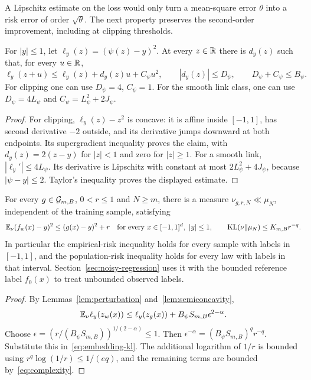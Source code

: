 A Lipschitz estimate on the loss would only turn a mean-square error $\theta$ into a risk error of order $\sqrt\theta$. The next property preserves the second-order improvement, including at clipping thresholds.

\begin{lemma}\label{lem:semiconcavity}
For $|y|\le1$, let $\ell_y(z)=(\psi(z)-y)^2$. At every $z\in\mathbb R$ there is $d_y(z)$ such that, for every $u\in\mathbb R$,
\begin{equation}
 \ell_y(z+u)\le\ell_y(z)+d_y(z)u+C_\psi u^2,
 \qquad |d_y(z)|\le D_\psi,\qquad D_\psi+C_\psi\le B_\psi.
 \label{eq:semiconcavity}
\end{equation}
For clipping one can use $D_\psi=4$, $C_\psi=1$. For the smooth link class, one can use $D_\psi=4L_\psi$ and $C_\psi=L_\psi^2+2J_\psi$.
\end{lemma}
\begin{proof}
For clipping, $\ell_y(z)-z^2$ is concave: it is affine inside $[-1,1]$, has second derivative $-2$ outside, and its derivative jumps downward at both endpoints. Its supergradient inequality proves the claim, with $d_y(z)=2(z-y)$ for $|z|<1$ and zero for $|z|\ge1$.
For a smooth link, $|\ell_y'|\le4L_\psi$. Its derivative is Lipschitz with constant at most $2L_\psi^2+4J_\psi$, because $|\psi-y|\le2$. Taylor's inequality proves the displayed estimate.
\end{proof}

\begin{lemma}\label{lem:comparison}
For every $g\in\mathcal G_{m,B}$, $0<r\le1$ and $N\ge m$, there is a measure $\nu_{g,r,N}\ll\mu_N$, independent of the training sample, satisfying
\begin{equation}
 \mathbb E_\nu(f_w(x)-y)^2\le(g(x)-y)^2+r
 \quad\text{for every }x\in[-1,1]^d,\ |y|\le1,
 \qquad \operatorname{KL}(\nu\|\mu_N)\le K_{m,B}r^{-q}.
 \label{eq:comparison}
\end{equation}
In particular the empirical-risk inequality holds for every sample with labels in $[-1,1]$, and the population-risk inequality holds for every law with labels in that interval. Section~\ref{sec:noisy-regression} uses it with the bounded reference label $f_0(x)$ to treat unbounded observed labels.
\end{lemma}
\begin{proof}
By Lemmas~\ref{lem:perturbation} and~\ref{lem:semiconcavity},
\[
 \mathbb E_\nu\ell_y(z_w(x))\le\ell_y(z_g(x))+B_\psi S_{m,B}\epsilon^{2-\alpha}.
\]
Choose $\epsilon=(r/(B_\psi S_{m,B}))^{1/(2-\alpha)}\le1$. Then $\epsilon^{-\alpha}=(B_\psi S_{m,B})^q r^{-q}$. Substitute this in~\eqref{eq:embedding-kl}. The additional logarithm of $1/r$ is bounded using $r^q\log(1/r)\le1/(eq)$, and the remaining terms are bounded by~\eqref{eq:complexity}.
\end{proof}

